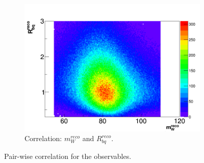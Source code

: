 \begin{figure} [h]
	\begin{subfigure}{0.4\textwidth}
	\includegraphics[width=\linewidth]{Pics/PlotCombi/mwRbq2.png}
	\caption{Correlation:  $m_{W}^{reco}$ and $R_{bq}^{reco}$.} \label{fig:1c}
	\end{subfigure}

	\caption{Pair-wise correlation for the observables.}
\end{figure}	
